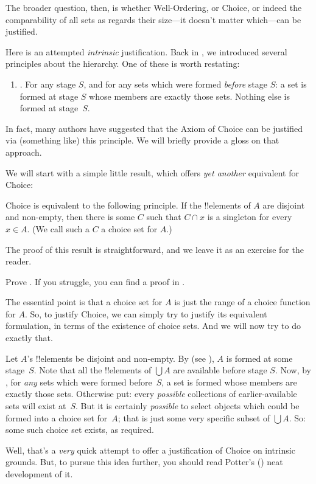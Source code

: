 \documentclass[../../../include/open-logic-section]{subfiles}
\begin{document}

The broader question, then, is whether Well-Ordering, or Choice, or
indeed the comparability of all sets as regards their size---it
doesn't matter which---can be justified. 

Here is an attempted \emph{intrinsic} justification. Back in
, we introduced several principles
about the hierarchy. One of these is worth restating:
\begin{enumerate}
	\item[] \stagesacc. For any stage $S$, and for any sets which were
	formed \emph{before} stage $S$: a set is formed at stage $S$ whose
	members are exactly those sets. Nothing else is formed at
	stage~$S$. 
\end{enumerate}
In fact, many authors have suggested that the Axiom of Choice can be
justified via (something like) this principle. We will briefly provide
a gloss on that approach.

We will start with a simple little result, which offers \emph{yet
another} equivalent for Choice:

\begin{thm}[in $\ZF$]
Choice is equivalent to the following principle. If the !!{element}s
of $A$ are disjoint and non-empty, then there is some $C$ such that $C
\cap x$ is a singleton for every $x \in A$. (We call such a $C$ a
{choice set} for $A$.)
\end{thm}

The proof of this result is straightforward, and we leave it as an
exercise for the reader. 

\begin{prob}
Prove . If you struggle,
you can find a proof in \cite[pp.~242--3]{Potter2004}.
\end{prob}

The essential point is that a choice set for $A$ is just the range of
a choice function for $A$. So, to justify Choice, we can simply try to
justify its equivalent formulation, in terms of the existence of
choice sets. And we will now try to do exactly that. 

Let $A$'s !!{element}s be disjoint and non-empty. By \stageshier{}
(see ), $A$ is formed at some stage~$S$. Note
that all the !!{element}s of $\bigcup A$ are available before stage
$S$. Now, by \stagesacc{}, for \emph{any} sets which were formed
before~$S$, a set is formed whose members are exactly those sets.
Otherwise put: every \emph{possible} collections of earlier-available
sets will exist at~$S$. But it is certainly \emph{possible} to select
objects which could be formed into a choice set for~$A$; that is just
some very specific subset of $\bigcup A$. So: some such choice set
exists, as required.

Well, that's a \emph{very} quick attempt to offer a justification of
Choice on intrinsic grounds. But, to pursue this idea further, you
should read Potter's (\citeyear[\S14.8]{Potter2004}) neat development
of it.
\end{document}
